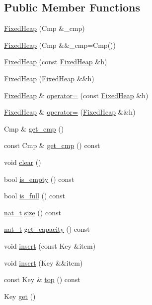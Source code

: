\subsection*{Public Member Functions}
\begin{DoxyCompactItemize}
\item 
\hyperlink{class_designar_1_1_fixed_heap_ac5dfd33a9ee1cedaad907c51afdf351d}{Fixed\+Heap} (Cmp \&\+\_\+cmp)
\item 
\hyperlink{class_designar_1_1_fixed_heap_adab7bd333df89c4b7f75568619020385}{Fixed\+Heap} (Cmp \&\&\+\_\+cmp=Cmp())
\item 
\hyperlink{class_designar_1_1_fixed_heap_abd58276d0d6e3ff20ea74bea6f6d65bb}{Fixed\+Heap} (const \hyperlink{class_designar_1_1_fixed_heap}{Fixed\+Heap} \&h)
\item 
\hyperlink{class_designar_1_1_fixed_heap_a15eca78039f66fb7944d825c7c53bf02}{Fixed\+Heap} (\hyperlink{class_designar_1_1_fixed_heap}{Fixed\+Heap} \&\&h)
\item 
\hyperlink{class_designar_1_1_fixed_heap}{Fixed\+Heap} \& \hyperlink{class_designar_1_1_fixed_heap_adb8f27056847e1b788e815db1a59db67}{operator=} (const \hyperlink{class_designar_1_1_fixed_heap}{Fixed\+Heap} \&h)
\item 
\hyperlink{class_designar_1_1_fixed_heap}{Fixed\+Heap} \& \hyperlink{class_designar_1_1_fixed_heap_a48202ae9224f22d0e88267279b0616a3}{operator=} (\hyperlink{class_designar_1_1_fixed_heap}{Fixed\+Heap} \&\&h)
\item 
Cmp \& \hyperlink{class_designar_1_1_fixed_heap_a29db925edd7d26a8cd6f8ee970e70b53}{get\+\_\+cmp} ()
\item 
const Cmp \& \hyperlink{class_designar_1_1_fixed_heap_a88f1060c9630d0c8e56fd58370b9a875}{get\+\_\+cmp} () const
\item 
void \hyperlink{class_designar_1_1_fixed_heap_a19f197809e896073e7e2cb05e2f741d1}{clear} ()
\item 
bool \hyperlink{class_designar_1_1_fixed_heap_a58cfde8fd6eedd215b79219970bf8fb8}{is\+\_\+empty} () const
\item 
bool \hyperlink{class_designar_1_1_fixed_heap_a85af858c5200cd8777925e4ae17ca9d2}{is\+\_\+full} () const
\item 
\hyperlink{namespace_designar_aa72662848b9f4815e7bf31a7cf3e33d1}{nat\+\_\+t} \hyperlink{class_designar_1_1_fixed_heap_a96991df55a68490d6ea9fdd10cf6d8ef}{size} () const
\item 
\hyperlink{namespace_designar_aa72662848b9f4815e7bf31a7cf3e33d1}{nat\+\_\+t} \hyperlink{class_designar_1_1_fixed_heap_a6f2b6bb5de9abd4718f07eb1261bee92}{get\+\_\+capacity} () const
\item 
void \hyperlink{class_designar_1_1_fixed_heap_a00227ce55200154dac2fcfb42026e353}{insert} (const Key \&item)
\item 
void \hyperlink{class_designar_1_1_fixed_heap_a7169684fe8e25834174cd2b1edcaf567}{insert} (Key \&\&item)
\item 
const Key \& \hyperlink{class_designar_1_1_fixed_heap_a2b48592e01a0b8836a18415219a310ca}{top} () const
\item 
Key \hyperlink{class_designar_1_1_fixed_heap_a0a274fa702d084e555b917b04ee73b37}{get} ()
\end{DoxyCompactItemize}


